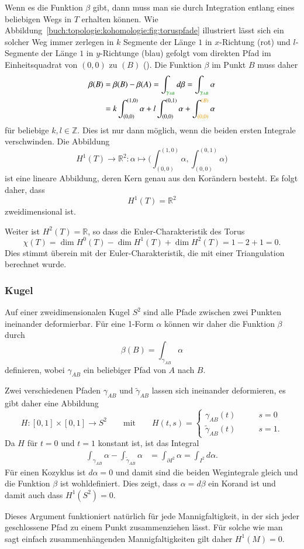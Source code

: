 Wenn es die Funktion $\beta$ gibt, dann muss man sie durch Integration
entlang eines beliebigen Wegs in $T$ erhalten können.
Wie Abbildung~\ref{buch:topologie:kohomologie:fig:toruspfade}
illustriert lässt sich ein solcher Weg immer zerlegen in 
$k$ Segmente der Länge $1$ in $x$-Richtung ({\color{darkred}rot})
und $l$-Segmente der Länge $1$ in $y$-Richtunge ({\color{blue}blau})
gefolgt vom direkten Pfad im Einheitsquadrat von $(0,0)$ zu $(B)$
({\color{orange}}).
Die Funktion $\beta$ im Punkt $B$ muss daher
\begin{align*}
\beta(B)
&=
\beta(B) - \beta(A)
=
\int_{{\color{darkgreen}\gamma_{AB}}} d\beta
=
\int_{{\color{darkgreen}\gamma_{AB}}} \alpha
\\
&=
k\int_{(0,0)}^{(1,0)}\alpha
+
l\int_{(0,0)}^{(0,1)}\alpha
+
\int_{(0,0)}^{\color{orange}(B)}\alpha
\end{align*}
für beliebige $k,l\in\mathbb{Z}$.
Dies ist nur dann möglich, wenn die beiden ersten Integrale verschwinden.
Die Abbildung
\[
H^1(T)
\to
\mathbb{R}^2
:
\alpha
\mapsto
\biggl(
\int_{(0,0)}^{(1,0)}
\alpha,
\int_{(0,0)}^{(0,1)}
\alpha
\biggr)
\]
ist eine lineare Abbildung, deren Kern genau aus den Korändern besteht.
Es folgt daher, dass
\[
H^1(T) = \mathbb{R}^2
\]
zweidimensional ist.

Weiter ist $H^2(T)=\mathbb{R}$, so dass die Euler-Charakteristik des Torus
\[
\chi(T)
=
\dim H^0(T) - \dim H^1(T) + \dim H^2(T)
=
1-2+1
=
0.
\]
Dies stimmt überein mit der Euler-Charakteristik, die mit einer Triangulation
berechnet wurde.

%
%
\subsubsection{Kugel}
Auf einer zweidimensionalen Kugel $S^2$ sind alle Pfade zwischen zwei
Punkten ineinander deformierbar.
Für eine 1-Form $\alpha$ können wir daher die Funktion $\beta$ durch
\[
\beta(B)
=
\int_{\gamma_{AB}} \alpha
\]
definieren, wobei $\gamma_{AB}$ ein beliebiger Pfad von $A$ nach $B$.

Zwei verschiedenen Pfaden $\gamma_{AB}$ und $\tilde{\gamma}_{AB}$
lassen sich ineinander deformieren, es gibt daher eine Abbildung
\[
H
\colon
[0,1]\times[0,1] \to S^2
\qquad\text{mit}\qquad
H(t,s)
=
\begin{cases}
\gamma_{AB}(t)          &\qquad s=0\\
\tilde{\gamma}_{AB} (t) &\qquad s=1.
\end{cases}
\]
Da $H$ für $t=0$ und $t=1$ konstant ist, ist das Integral 
\begin{align*}
\int_{\gamma_{AB}} \alpha
-
\int_{\tilde{\gamma}_{AB}} \alpha
&=
\int_{\partial I^2} \alpha
=
\int_{I^2} d\alpha.
\end{align*}
Für einen Kozyklus ist $d\alpha=0$ und damit sind die beiden Wegintegrale
gleich und die Funktion $\beta$ ist wohldefiniert.
Dies zeigt, dass $\alpha=d\beta$ ein Korand ist und damit auch dass
$H^1(S^2)=0$.

Dieses Argument funktioniert natürlich für jede Mannigfaltigkeit,
in der sich jeder geschlossene Pfad zu einem Punkt zusammenziehen
lässt.
Für solche wie man sagt einfach zusammenhängenden Mannigfaltigkeiten
gilt daher $H^1(M)=0$.



